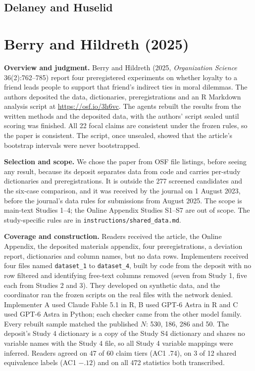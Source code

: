 \documentclass[11pt]{article}
\newcommand{\artifact}[1]{\nolinkurl{#1}}
\begin{document}
\subsection{Delaney and Huselid}\label{sec:tables-delaney1996}


\clearpage
\section{Berry and Hildreth (2025)}\label{sec:berry}
\textbf{Overview and judgment.} Berry and Hildreth (2025, \textit{Organization Science} 36(2):762--785) report four preregistered experiments on whether loyalty to a friend leads people to support that friend's indirect ties in moral dilemmas. The authors deposited the data, dictionaries, preregistrations and an R Markdown analysis script at \url{https://osf.io/3h6vc}. The agents rebuilt the results from the written methods and the deposited data, with the authors' script sealed until scoring was finished. All 22 focal claims are consistent under the frozen rules, so the paper is consistent. The script, once unsealed, showed that the article's bootstrap intervals were never bootstrapped.

\textbf{Selection and scope.} We chose the paper from OSF file listings, before seeing any result, because its deposit separates data from code and carries per-study dictionaries and preregistrations. It is outside the 277 screened candidates and the six-case comparison, and it was received by the journal on 1 August 2023, before the journal's data rules for submissions from August 2025. The scope is main-text Studies 1--4; the Online Appendix Studies S1--S7 are out of scope. The study-specific rules are in \artifact{instructions/shared_data.md}.

\textbf{Coverage and construction.} Readers received the article, the Online Appendix, the deposited materials appendix, four preregistrations, a deviation report, dictionaries and column names, but no data rows. Implementers received four files named \texttt{dataset\_1} to \texttt{dataset\_4}, built by code from the deposit with no row filtered and identifying free-text columns removed (seven from Study 1, five each from Studies 2 and 3). They developed on synthetic data, and the coordinator ran the frozen scripts on the real files with the network denied. Implementer A used Claude Fable 5.1 in R, B used GPT-6 Astra in R and C used GPT-6 Astra in Python; each checker came from the other model family. Every rebuilt sample matched the published $N$: 530, 186, 286 and 50. The deposit's Study 4 dictionary is a copy of the Study S4 dictionary and shares no variable names with the Study 4 file, so all Study 4 variable mappings were inferred. Readers agreed on 47 of 60 claim tiers (AC1 .74), on 3 of 12 shared equivalence labels (AC1 $-.12$) and on all 472 statistics both transcribed.
\end{document}
